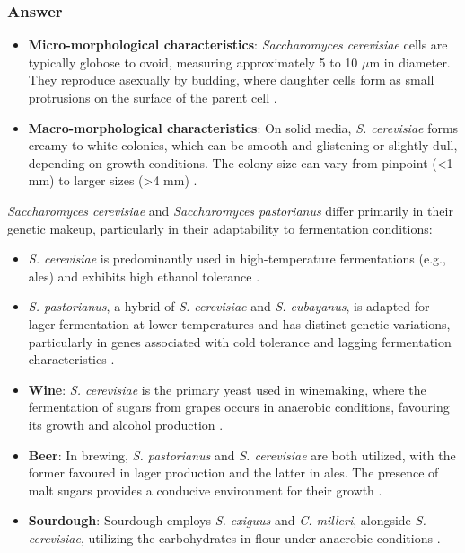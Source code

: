 \subsubsection*{Answer}
\begin{itemize}
    \item \textbf{Micro-morphological characteristics}: \textit{Saccharomyces cerevisiae} cells are typically globose to ovoid, measuring approximately 5 to 10 $\mu$m in diameter. They reproduce asexually by budding, where daughter cells form as small protrusions on the surface of the parent cell \cite*{LabManual}.
    \item \textbf{Macro-morphological characteristics}: On solid media, \textit{S. cerevisiae} forms creamy to white colonies, which can be smooth and glistening or slightly dull, depending on growth conditions. The colony size can vary from pinpoint (<1 mm) to larger sizes (>4 mm) \cite*{LabManual}.
\end{itemize}

\textit{Saccharomyces cerevisiae} and \textit{Saccharomyces pastorianus} differ primarily in their genetic makeup, particularly in their adaptability to fermentation conditions:
\begin{itemize}
    \item \textit{S. cerevisiae} is predominantly used in high-temperature fermentations (e.g., ales) and exhibits high ethanol tolerance \cite*{L9-Coryn,L6-Yeasts}.
    \item \textit{S. pastorianus}, a hybrid of \textit{S. cerevisiae} and \textit{S. eubayanus}, is adapted for lager fermentation at lower temperatures and has distinct genetic variations, particularly in genes associated with cold tolerance and lagging fermentation characteristics \cite*{L9-Coryn,L6-Yeasts}.
\end{itemize}

\begin{itemize}
    \item \textbf{Wine}: \textit{S. cerevisiae} is the primary yeast used in winemaking, where the fermentation of sugars from grapes occurs in anaerobic conditions, favouring its growth and alcohol production \cite*{L9-ISAPP,L9-Coryn,LabManual}.
    \item \textbf{Beer}: In brewing, \textit{S. pastorianus} and \textit{S. cerevisiae} are both utilized, with the former favoured in lager production and the latter in ales. The presence of malt sugars provides a conducive environment for their growth \cite*{L9-ISAPP,L9-Coryn}.
    \item \textbf{Sourdough}: Sourdough employs \textit{S. exiguus} and \textit{C. milleri}, alongside \textit{S. cerevisiae}, utilizing the carbohydrates in flour under anaerobic conditions \cite*{L9-Coryn,L6-Yeasts}.
\end{itemize}

